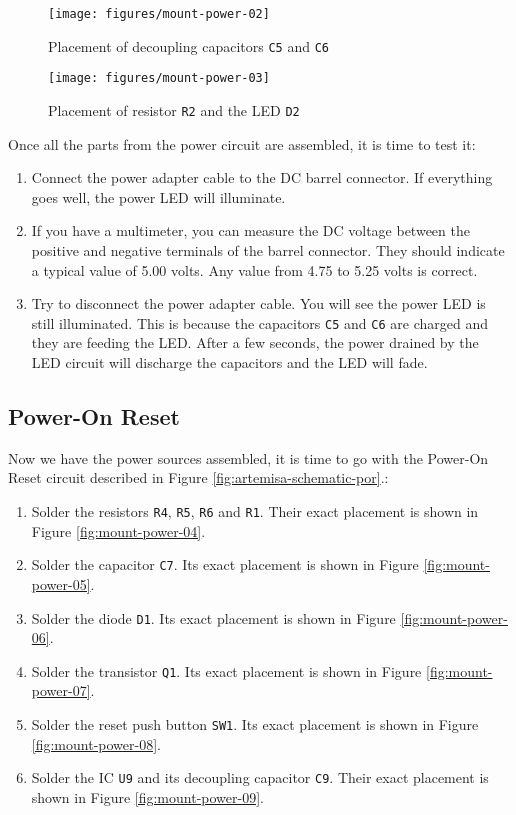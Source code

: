 \begin{figure}[htbp]
  \centering
  \texttt{[image: figures/mount-power-02]}
  \caption{Placement of decoupling capacitors {\tt C5} and {\tt C6}}
  \label{fig:mount-power-02}
\end{figure}

\begin{figure}[htbp]
  \centering
  \texttt{[image: figures/mount-power-03]}
  \caption{Placement of resistor {\tt R2} and the LED {\tt D2}}
  \label{fig:mount-power-03}
\end{figure}

Once all the parts from the power circuit are assembled, it is time to test it:

\begin{enumerate}
  \item Connect the power adapter cable to the DC barrel connector. If everything goes well, the power LED will illuminate.
  \item If you have a multimeter, you can measure the DC voltage between the positive and negative terminals of the barrel connector. They should indicate a typical value of 5.00 volts. Any value from 4.75 to 5.25 volts is correct.
  \item Try to disconnect the power adapter cable. You will see the power LED is still illuminated. This is because the capacitors {\tt C5} and {\tt C6} are charged and they are feeding the LED. After a few seconds, the power drained by the LED circuit will discharge the capacitors and the LED will fade.
\end{enumerate}

\subsection{Power-On Reset}

Now we have the power sources assembled, it is time to go with the Power-On Reset circuit described in Figure \ref{fig:artemisa-schematic-por}.:

\begin{enumerate}
  \item Solder the resistors {\tt R4}, {\tt R5}, {\tt R6} and {\tt R1}. Their exact placement is shown in Figure \ref{fig:mount-power-04}.
  \item Solder the capacitor {\tt C7}. Its exact placement is shown in Figure \ref{fig:mount-power-05}.
  \item Solder the diode {\tt D1}. Its exact placement is shown in Figure \ref{fig:mount-power-06}.
  \item Solder the transistor {\tt Q1}. Its exact placement is shown in Figure \ref{fig:mount-power-07}.
  \item Solder the reset push button {\tt SW1}. Its exact placement is shown in Figure \ref{fig:mount-power-08}.
  \item Solder the IC {\tt U9} and its decoupling capacitor {\tt C9}. Their exact placement is shown in Figure \ref{fig:mount-power-09}.
\end{enumerate}

